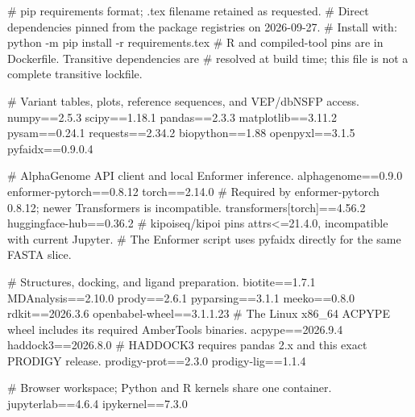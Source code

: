 # pip requirements format; .tex filename retained as requested.
# Direct dependencies pinned from the package registries on 2026-09-27.
# Install with: python -m pip install -r requirements.tex
# R and compiled-tool pins are in Dockerfile. Transitive dependencies are
# resolved at build time; this file is not a complete transitive lockfile.

# Variant tables, plots, reference sequences, and VEP/dbNSFP access.
numpy==2.5.3
scipy==1.18.1
pandas==2.3.3
matplotlib==3.11.2
pysam==0.24.1
requests==2.34.2
biopython==1.88
openpyxl==3.1.5
pyfaidx==0.9.0.4

# AlphaGenome API client and local Enformer inference.
alphagenome==0.9.0
enformer-pytorch==0.8.12
torch==2.14.0
# Required by enformer-pytorch 0.8.12; newer Transformers is incompatible.
transformers[torch]==4.56.2
huggingface-hub==0.36.2
# kipoiseq/kipoi pins attrs<=21.4.0, incompatible with current Jupyter.
# The Enformer script uses pyfaidx directly for the same FASTA slice.

# Structures, docking, and ligand preparation.
biotite==1.7.1
MDAnalysis==2.10.0
prody==2.6.1
pyparsing==3.1.1
meeko==0.8.0
rdkit==2026.3.6
openbabel-wheel==3.1.1.23
# The Linux x86_64 ACPYPE wheel includes its required AmberTools binaries.
acpype==2026.9.4
haddock3==2026.8.0
# HADDOCK3 requires pandas 2.x and this exact PRODIGY release.
prodigy-prot==2.3.0
prodigy-lig==1.1.4

# Browser workspace; Python and R kernels share one container.
jupyterlab==4.6.4
ipykernel==7.3.0
